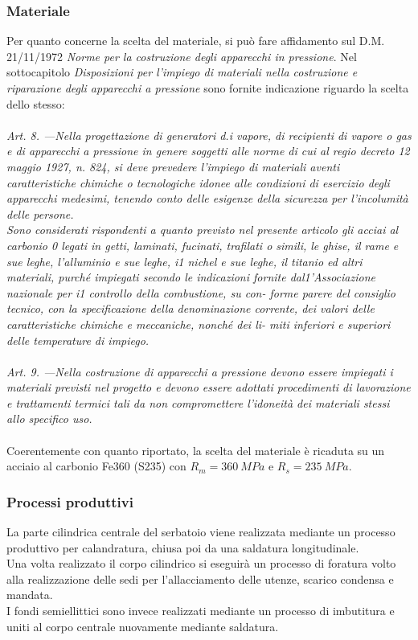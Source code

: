 \subsubsection{Materiale}
Per quanto concerne la scelta del materiale, si può fare affidamento sul D.M. 21/11/1972 \emph{Norme per la costruzione degli apparecchi in pressione}. Nel sottocapitolo \emph{Disposizioni per l'impiego di materiali nella costruzione e riparazione degli apparecchi a pressione} sono fornite indicazione riguardo la scelta dello stesso:\\
\\
\emph{Art. 8. —Nella progettazione di generatori d.i vapore, di recipienti di vapore o gas e di apparecchi a pressione in genere soggetti alle norme di cui al regio decreto 12 maggio 1927, n. 824, si deve prevedere l’impiego di materiali aventi caratteristiche chimiche o tecnologiche idonee alle condizioni di esercizio degli apparecchi medesimi, tenendo conto delle esigenze della sicurezza per l’incolumità delle persone.\\
Sono considerati rispondenti a quanto previsto nel presente articolo gli acciai al carbonio 0 legati in getti, laminati, fucinati, trafilati o simili, le ghise, il rame e sue leghe, l’alluminio e sue leghe, i1 nichel e sue leghe, il titanio ed altri materiali, purché impiegati secondo le indicazioni fornite dal1’Associazione nazionale per i1 controllo della combustione, su con- forme parere del consiglio tecnico, con la specificazione della denominazione corrente, dei valori delle caratteristiche chimiche e meccaniche, nonché dei li- miti inferiori e superiori delle temperature di impiego.\\
\\
Art. 9. —Nella costruzione di apparecchi a pressione devono essere impiegati i materiali previsti nel progetto e devono essere adottati procedimenti di lavorazione e trattamenti termici tali da non compromettere l'idoneità dei materiali stessi allo specifico uso.\\}
\\
Coerentemente con quanto riportato, la scelta del materiale è ricaduta su un acciaio al carbonio Fe360 (S235) con $R_m=360\ MPa$ e $R_s=235\ MPa$. 
\subsubsection{Processi produttivi}
La parte cilindrica centrale del serbatoio viene realizzata mediante un processo produttivo per calandratura, chiusa poi da una saldatura longitudinale.\\
Una volta realizzato il corpo cilindrico si eseguirà un processo di foratura volto alla realizzazione delle sedi per l'allacciamento delle utenze, scarico condensa e mandata. \\
I fondi semiellittici sono invece realizzati mediante un processo di imbutitura e uniti al corpo centrale nuovamente mediante saldatura.
